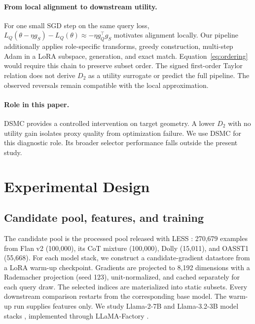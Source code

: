 \documentclass{article}
\newcommand{\method}{\textsc{DSMC}}
\newcommand{\dsecond}{D_2}
\begin{document}
\paragraph{From local alignment to downstream utility.}
For one small SGD step on the same query loss,
$L_Q(\theta-\eta g_S)-L_Q(\theta)\approx-\eta g_Q^\top g_S$ motivates
alignment locally. Our pipeline additionally applies role-specific transforms,
greedy construction, multi-step Adam in a LoRA subspace, generation, and exact
match. Equation~\ref{eq:ordering} would require this chain to preserve subset
order. The signed first-order Taylor relation does not derive $\dsecond$ as a
utility surrogate or predict the full pipeline. The observed reversals remain
compatible with the local approximation.

\paragraph{Role in this paper.}
\method{} provides a controlled intervention on target geometry. A lower
$\dsecond$ with no utility gain isolates proxy quality from optimization
failure. We use DSMC for this diagnostic role. Its broader selector performance
falls outside the present study.

\section{Experimental Design}
\label{sec:setup}

\subsection{Candidate pool, features, and training}

The candidate pool is the processed pool released with LESS
\citep{xia2024less}: 270,679 examples from Flan v2
\citep{longpre2023flan} (100,000), its CoT mixture (100,000), Dolly
\citep{dolly2023dataset} (15,011), and OASST1
\citep{kopf2023oasst1} (55,668). For each model stack, we construct a
candidate-gradient datastore from a LoRA \citep{hu2022lora} warm-up
checkpoint. Gradients are projected to 8,192 dimensions with a Rademacher
projection (seed 123), unit-normalized, and cached separately for each query
draw.
The selected indices are materialized into static subsets. Every downstream
comparison restarts from the corresponding base model. The warm-up run supplies
features only. We study Llama-2-7B and Llama-3.2-3B model stacks
\citep{touvron2023llama2,grattafiori2024llama3,meta2024llama32},
implemented through
LLaMA-Factory \citep{zheng2024llamafactory}.
\end{document}
